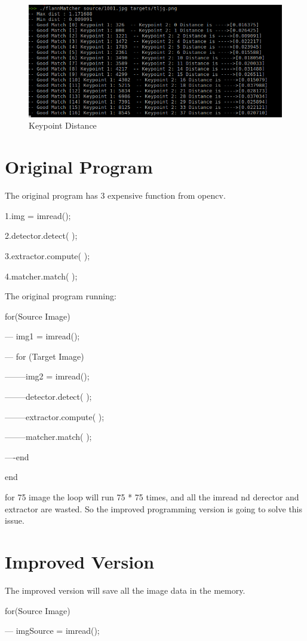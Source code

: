 \documentclass[journal]{IEEEtran}
\begin{document}
		\begin{figure}[h]
			\centering
			\includegraphics[scale=0.15]{Figure/distance.png}
			\caption{ Keypoint Distance }
			\label{fig:figure9}
		\end{figure} 

\section{Original Program}
The original program has 3 expensive function from opencv.

1.img = imread();

2.detector.detect( );

3.extractor.compute( );

4.matcher.match( );

The original program running: 

for(Source Image)

--- img1 = imread();
	
---	for (Target Image)

--------img2 = imread();

--------detector.detect( );

--------extractor.compute( );

--------matcher.match( );

----end

end

for 75 image the loop will run 75 * 75 times, and all the imread nd derector and extractor are wasted. So the improved programming version is going to solve this issue. 

\section{Improved Version}
The improved version will save all the image data in the memory.  

for(Source Image)

--- imgSource = imread();
\end{document}
